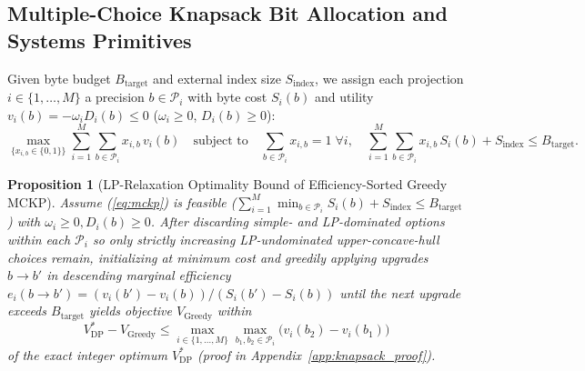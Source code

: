 \documentclass[10pt]{article} %
\renewcommand{\eqref}[1]{(\ref{#1})}
\newtheorem{proposition}{Proposition}
\begin{document}
\subsection{Multiple-Choice Knapsack Bit Allocation and Systems Primitives}
\label{sec:theory_knapsack}

Given byte budget $B_{\text{target}}$ and external index size $S_{\text{index}}$, we assign each projection $i \in \{1,\dots,M\}$ a precision $b \in \mathcal{P}_i$ with byte cost $S_i(b)$ and utility $v_i(b) = -\omega_i D_i(b) \le 0$ ($\omega_i \ge 0$, $D_i(b) \ge 0$):
\begin{equation}
    \max_{\{x_{i,b} \in \{0,1\}\}} \sum_{i=1}^{M} \sum_{b \in \mathcal{P}_i} x_{i,b}\, v_i(b)
    \quad \text{subject to} \quad
    \sum_{b \in \mathcal{P}_i} x_{i,b} = 1\;\forall i, \quad
    \sum_{i=1}^{M} \sum_{b \in \mathcal{P}_i} x_{i,b}\, S_i(b) + S_{\text{index}} \le B_{\text{target}}.
    \label{eq:mckp}
\end{equation}

\begin{proposition}[LP-Relaxation Optimality Bound of Efficiency-Sorted Greedy MCKP]
\label{prop:knapsack}
Assume \eqref{eq:mckp} is feasible ($\sum_{i=1}^{M} \min_{b \in \mathcal{P}_i} S_i(b) + S_{\text{index}} \le B_{\text{target}}$) with $\omega_i \ge 0, D_i(b) \ge 0$. After discarding simple- and LP-dominated options within each $\mathcal{P}_i$ so only strictly increasing LP-undominated upper-concave-hull choices remain, initializing at minimum cost and greedily applying upgrades $b \to b'$ in descending marginal efficiency $e_i(b \to b') = (v_i(b') - v_i(b))/(S_i(b') - S_i(b))$ until the next upgrade exceeds $B_{\text{target}}$ yields objective $V_{\mathrm{Greedy}}$ within
\begin{equation}
    V_{\mathrm{DP}}^* - V_{\mathrm{Greedy}} \le \max_{i \in \{1,\dots,M\}} \max_{b_1, b_2 \in \mathcal{P}_i} \big(v_i(b_2) - v_i(b_1)\big)
    \label{eq:knapsack_gap}
\end{equation}
of the exact integer optimum $V_{\mathrm{DP}}^*$ (proof in Appendix~\ref{app:knapsack_proof}).
\end{proposition}
\end{document}
